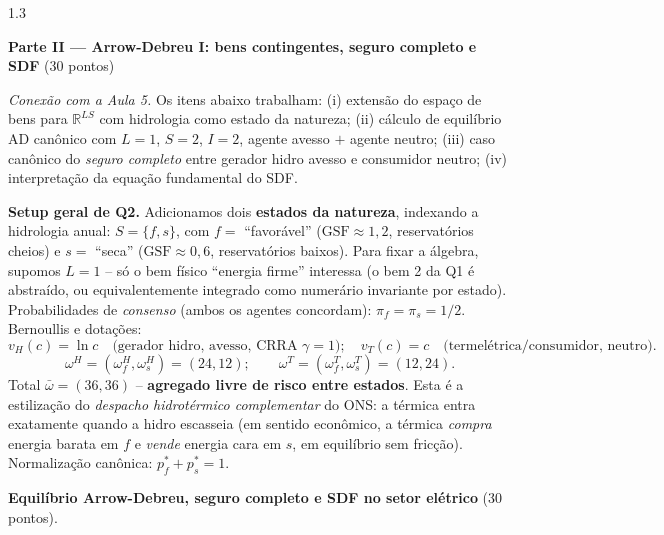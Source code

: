 \documentclass[11pt,addpoints]{exam}
\newcommand{\GSF}{\text{GSF}}
\begin{document}
\begin{spacing}{1.3}
\begin{questions}
\end{questions}

\newpage

\begin{center}\large\textbf{Parte II --- Arrow-Debreu I: bens contingentes, seguro completo e SDF} \quad (30 pontos)\end{center}

\textit{Conexão com a Aula 5.} Os itens abaixo trabalham: (i) extensão do espaço de bens para $\mathbb{R}^{LS}$ com hidrologia como estado da natureza; (ii) cálculo de equilíbrio AD canônico com $L = 1$, $S = 2$, $I = 2$, agente avesso $+$ agente neutro; (iii) caso canônico do \emph{seguro completo} entre gerador hidro avesso e consumidor neutro; (iv) interpretação da equação fundamental do SDF.

\noindent\textbf{Setup geral de Q2.} Adicionamos dois \textbf{estados da natureza}, indexando a hidrologia anual: $S = \{f, s\}$, com $f =$ ``favorável'' ($\GSF \approx 1{,}2$, reservatórios cheios) e $s =$ ``seca'' ($\GSF \approx 0{,}6$, reservatórios baixos). Para fixar a álgebra, supomos $L = 1$ -- só o bem físico ``energia firme'' interessa (o bem 2 da Q1 é abstraído, ou equivalentemente integrado como numerário invariante por estado). Probabilidades de \emph{consenso} (ambos os agentes concordam): $\pi_f = \pi_s = 1/2$. Bernoullis e dotações:
\[
    v_H(c) = \ln c \quad \text{(gerador hidro, avesso, CRRA $\gamma = 1$)};\quad v_T(c) = c \quad \text{(termelétrica/consumidor, neutro)}.
\]
\[
    \omega^H = (\omega^H_f, \omega^H_s) = (24, 12);\qquad \omega^T = (\omega^T_f, \omega^T_s) = (12, 24).
\]
Total $\bar\omega = (36, 36)$ -- \textbf{agregado livre de risco entre estados}. Esta é a estilização do \emph{despacho hidrotérmico complementar} do ONS: a térmica entra exatamente quando a hidro escasseia (em sentido econômico, a térmica \emph{compra} energia barata em $f$ e \emph{vende} energia cara em $s$, em equilíbrio sem fricção). Normalização canônica: $p^*_f + p^*_s = 1$.

\begin{questions}
\setcounter{question}{1}
\question \textbf{Equilíbrio Arrow-Debreu, seguro completo e SDF no setor elétrico} (30 pontos).

\end{questions}
\end{spacing}
\end{document}
